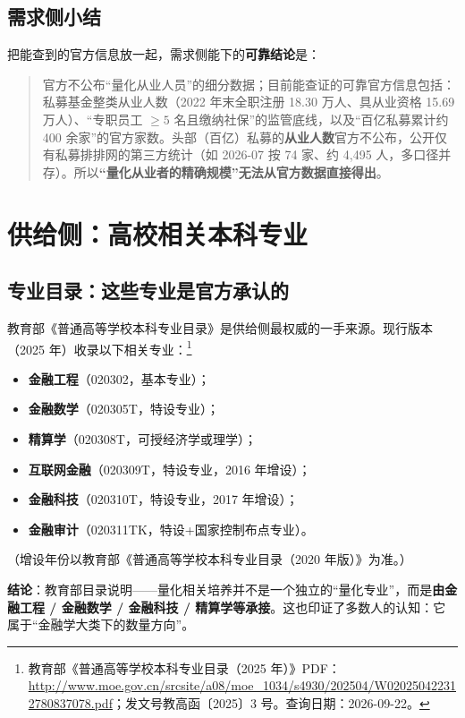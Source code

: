 \documentclass[UTF8,11pt]{ctexart}
\begin{document}
\subsection{需求侧小结}

把能查到的官方信息放一起，需求侧能下的\textbf{可靠结论}是：
\begin{quote}
官方不公布“量化从业人员”的细分数据；目前能查证的可靠官方信息包括：私募基金整类从业人数（2022 年末全职注册 18.30 万人、具从业资格 15.69 万人）、“专职员工 $\ge 5$ 名且缴纳社保”的监管底线，以及“百亿私募累计约 400 余家”的官方家数。头部（百亿）私募的\textbf{从业人数}官方不公布，公开仅有私募排排网的第三方统计（如 2026-07 按 74 家、约 4,495 人，多口径并存）。所以\textbf{“量化从业者的精确规模”无法从官方数据直接得出}。
\end{quote}

\section{供给侧：高校相关本科专业}

\subsection{专业目录：这些专业是官方承认的}

教育部《普通高等学校本科专业目录》是供给侧最权威的一手来源。现行版本（2025 年）收录以下相关专业：\footnote{教育部《普通高等学校本科专业目录（2025 年）》PDF：\url{http://www.moe.gov.cn/srcsite/a08/moe_1034/s4930/202504/W020250422312780837078.pdf}；发文号教高函〔2025〕3 号。查询日期：2026-09-22。}
\begin{itemize}[itemsep=2pt]
\item \textbf{金融工程}（020302，基本专业）；
\item \textbf{金融数学}（020305T，特设专业）；
\item \textbf{精算学}（020308T，可授经济学或理学）；
\item \textbf{互联网金融}（020309T，特设专业，2016 年增设）；
\item \textbf{金融科技}（020310T，特设专业，2017 年增设）；
\item \textbf{金融审计}（020311TK，特设+国家控制布点专业）。
\end{itemize}
（增设年份以教育部《普通高等学校本科专业目录（2020 年版）》为准。）

\textbf{结论}：教育部目录说明——量化相关培养并不是一个独立的“量化专业”，而是\textbf{由金融工程 / 金融数学 / 金融科技 / 精算学等承接}。这也印证了多数人的认知：它属于“金融学大类下的数量方向”。
\end{document}
